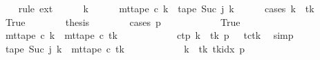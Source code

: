 \begin{isabellebody}
\ \ \isamarkupfalse%
\ {\isacharparenleft}{\kern0pt}rule\ ext{\isacharparenright}{\kern0pt}\isanewline
\ \ \ \ \isamarkupfalse%
\ k\isanewline
\ \ \ \ \isamarkupfalse%
\ {\isachardoublequoteopen}mt{\isacharunderscore}{\kern0pt}tape\ c{\isacharprime}{\kern0pt}\ k\ {\isacharequal}{\kern0pt}\ {\isacharquery}{\kern0pt}tape\ {\isacharparenleft}{\kern0pt}Suc\ j{\isacharparenright}{\kern0pt}\ k{\isachardoublequoteclose}\isanewline
\ \ \ \ \isamarkupfalse%
\ {\isacharparenleft}{\kern0pt}cases\ {\isachardoublequoteopen}k\ {\isacharequal}{\kern0pt}\ {\isacharquery}{\kern0pt}tk{\isachardoublequoteclose}{\isacharparenright}{\kern0pt}\isanewline
\ \ \ \ \ \ \isamarkupfalse%
\ True\isanewline
\ \ \ \ \ \ \isamarkupfalse%
\ {\isacharquery}{\kern0pt}thesis\isanewline
\ \ \ \ \ \ \isamarkupfalse%
\ {\isacharparenleft}{\kern0pt}cases\ {\isachardoublequoteopen}{\isacharquery}{\kern0pt}p\ {\isacharequal}{\kern0pt}\ {}{\isachardoublequoteclose}{\isacharparenright}{\kern0pt}\isanewline
\ \ \ \ \ \ \ \ \isamarkupfalse%
\ True\isanewline
\ \ \ \ \ \ \ \ \isamarkupfalse%
\ {\isachardoublequoteopen}mt{\isacharunderscore}{\kern0pt}tape\ c{\isacharprime}{\kern0pt}\ k\ {\isacharequal}{\kern0pt}\ mt{\isacharunderscore}{\kern0pt}tape\ c{}\ {\isacharquery}{\kern0pt}tk{\isachardoublequoteclose}\isanewline
\ \ \ \ \ \ \ \ \ \ \isamarkupfalse%
\ c{\isacharprime}{\kern0pt}{\isacharunderscore}{\kern0pt}tp\ {\isacartoucheopen}k\ {\isacharequal}{\kern0pt}\ {\isacharquery}{\kern0pt}tk{\isacartoucheclose}\ {\isacartoucheopen}{\isacharquery}{\kern0pt}p\ {\isacharequal}{\kern0pt}\ {}{\isacartoucheclose}\ tc{\isacharunderscore}{\kern0pt}tk\ \isamarkupfalse%
\ simp\isanewline
\ \ \ \ \ \ \ \ \isamarkupfalse%
\ \isamarkupfalse%
\ {\isachardoublequoteopen}{\isacharquery}{\kern0pt}tape\ {\isacharparenleft}{\kern0pt}Suc\ j{\isacharparenright}{\kern0pt}\ k\ {\isacharequal}{\kern0pt}\ mt{\isacharunderscore}{\kern0pt}tape\ c{}\ {\isacharquery}{\kern0pt}tk{\isachardoublequoteclose}\isanewline
\ \ \ \ \ \ \ \ \ \ \isamarkupfalse%
\ {\isacartoucheopen}k\ {\isacharequal}{\kern0pt}\ {\isacharquery}{\kern0pt}tk{\isacartoucheclose}\ tkidx\ {\isacartoucheopen}{\isacharquery}{\kern0pt}p\ {\isacharequal}{\kern0pt}\ {}{\isacartoucheclose}\ \isamarkupfalse%

\end{isabellebody}
